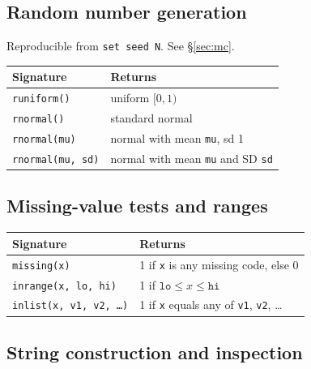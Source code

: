 \documentclass[11pt,letterpaper]{article}
\begin{document}
\subsection{Random number generation}

Reproducible from \texttt{set seed N}.  See \S\ref{sec:mc}.

\begin{center}
\begin{tabular}{ll}
\toprule
Signature & Returns \\
\midrule
\texttt{runiform()} & uniform $[0, 1)$ \\
\texttt{rnormal()} & standard normal \\
\texttt{rnormal(mu)} & normal with mean \texttt{mu}, sd 1 \\
\texttt{rnormal(mu, sd)} & normal with mean \texttt{mu} and SD \texttt{sd} \\
\bottomrule
\end{tabular}
\end{center}

\subsection{Missing-value tests and ranges}

\begin{center}
\begin{tabular}{ll}
\toprule
Signature & Returns \\
\midrule
\texttt{missing(x)} & 1 if \texttt{x} is any missing code, else 0 \\
\texttt{inrange(x, lo, hi)} & 1 if $\mathtt{lo} \le x \le \mathtt{hi}$ \\
\texttt{inlist(x, v1, v2, \ldots)} & 1 if \texttt{x} equals any of \texttt{v1}, \texttt{v2}, \ldots \\
\bottomrule
\end{tabular}
\end{center}

\subsection{String construction and inspection}
\end{document}

